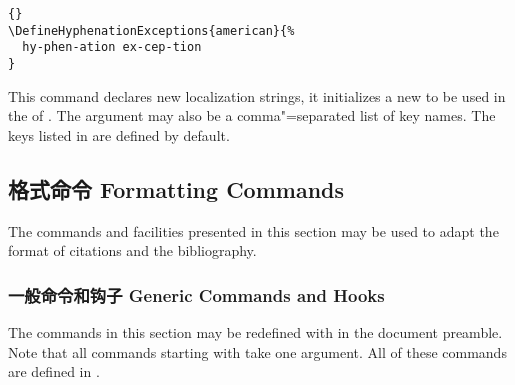 \begin{ltxsyntax}
\begin{lstlisting}[style=latex]{}
\DefineHyphenationExceptions{american}{%
  hy-phen-ation ex-cep-tion
}
\end{lstlisting}


This command declares new localization strings, \ie it initializes a new  to be used in the
 of . The  argument may also be a comma"=separated
list of key names. The keys listed in  are defined by default.

\end{ltxsyntax}

\subsection{格式命令 Formatting Commands}
\label{use:fmt}

The commands and facilities presented in this section may be used to adapt the format of citations and the bibliography.

\subsubsection{一般命令和钩子 Generic Commands and Hooks}
\label{use:fmt:fmt}

The commands in this section may be redefined with  in the document preamble. Note that all commands starting with  take one argument. All of these commands are defined in .

